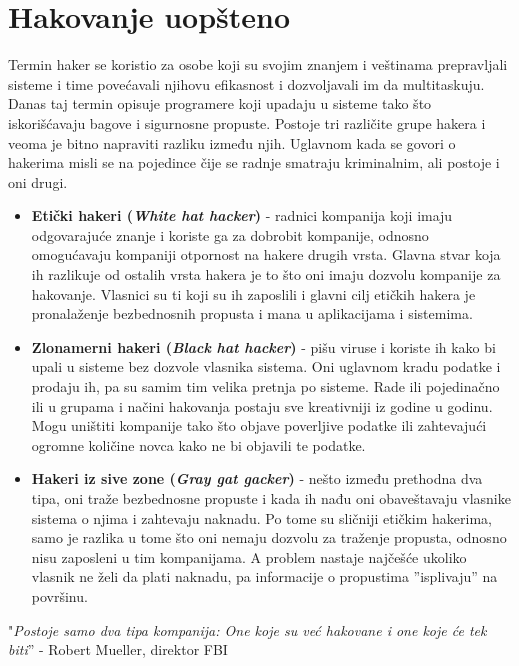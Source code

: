 \documentclass[a4paper]{article}
\begin{document}
{\newpage

\section{Hakovanje uopšteno}
\label{sec:hakovanje}
Termin haker se koristio za osobe koji su svojim znanjem i veštinama prepravljali sisteme i time povećavali njihovu efikasnost i dozvoljavali im da multitaskuju. 
Danas taj termin opisuje programere koji upadaju u sisteme tako što iskorišćavaju bagove i sigurnosne propuste.
Postoje tri različite grupe hakera i veoma je bitno napraviti razliku između njih. Uglavnom kada se govori o hakerima misli se na pojedince čije se radnje smatraju kriminalnim, ali postoje i oni drugi.

\begin{itemize}
\item \textbf{Etički hakeri ({\em White hat hacker})} - radnici kompanija koji imaju odgovarajuće znanje i koriste ga za dobrobit kompanije, odnosno omogućavaju kompaniji otpornost na hakere drugih vrsta. Glavna stvar koja ih razlikuje od ostalih vrsta hakera je to što oni imaju dozvolu kompanije za hakovanje. Vlasnici su ti koji su ih zaposlili i glavni cilj etičkih hakera je pronalaženje bezbednosnih propusta i mana u aplikacijama i sistemima.
\item \textbf{Zlonamerni hakeri ({\em Black hat hacker})} - pišu viruse i koriste ih kako bi upali u sisteme bez dozvole vlasnika sistema. Oni uglavnom kradu podatke i prodaju ih, pa su samim tim velika pretnja po sisteme. Rade ili pojedinačno ili u grupama i načini hakovanja postaju sve kreativniji iz godine u godinu. Mogu uništiti kompanije tako što objave poverljive podatke ili zahtevajući ogromne količine novca kako ne bi objavili te podatke.
\item \textbf{Hakeri iz sive zone ({\em Gray gat gacker})} - nešto između prethodna dva tipa, oni traže bezbednosne propuste i kada ih nađu oni obaveštavaju vlasnike sistema o njima i zahtevaju naknadu. Po tome su sličniji etičkim hakerima, samo je razlika u tome što oni nemaju dozvolu za traženje propusta, odnosno nisu zaposleni u tim kompanijama. A problem nastaje najčešće ukoliko vlasnik ne želi da plati naknadu, pa informacije o propustima ''isplivaju'' na površinu.\cite{ethackandcybersec}\\
\end{itemize} 


"{\em Postoje samo dva tipa kompanija: One koje su već hakovane i one koje će tek biti}'' - Robert Mueller, direktor FBI
\newpage

}
\end{document}
